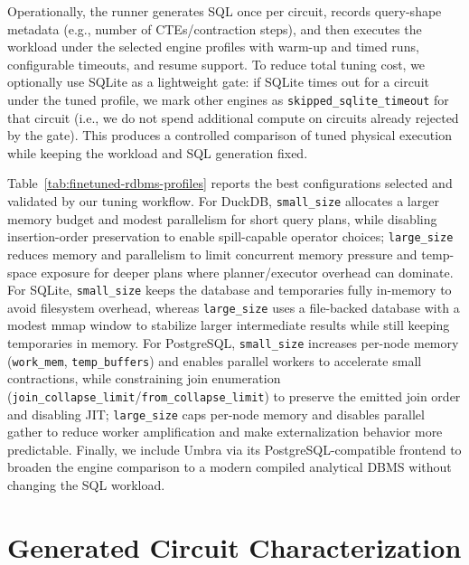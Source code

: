 Operationally, the runner generates SQL once per circuit, records query-shape metadata
(e.g., number of CTEs/contraction steps), and then executes the workload under the
selected engine profiles with warm-up and timed runs, configurable timeouts, and resume
support. To reduce total tuning cost, we optionally use SQLite as a lightweight gate:
if SQLite times out for a circuit under the tuned profile, we mark other engines as
\texttt{skipped\_sqlite\_timeout} for that circuit (i.e., we do not spend additional
compute on circuits already rejected by the gate). This produces a controlled comparison
of tuned physical execution while keeping the workload and SQL generation fixed.

Table~\ref{tab:finetuned-rdbms-profiles} reports the best configurations selected and validated by our tuning workflow. For DuckDB, \texttt{small\_size} allocates a larger memory budget and modest parallelism for short query plans, while disabling insertion-order preservation to enable spill-capable operator choices; \texttt{large\_size} reduces memory and parallelism to limit concurrent memory pressure and temp-space exposure for deeper plans where planner/executor overhead can dominate. For SQLite, \texttt{small\_size} keeps the database and temporaries fully in-memory to avoid filesystem overhead, whereas \texttt{large\_size} uses a file-backed database with a modest mmap window to stabilize larger intermediate results while still keeping temporaries in memory. For PostgreSQL, \texttt{small\_size} increases per-node memory (\texttt{work\_mem}, \texttt{temp\_buffers}) and enables parallel workers to accelerate small contractions, while constraining join enumeration (\texttt{join\_collapse\_limit}/\texttt{from\_collapse\_limit}) to preserve the emitted join order and disabling JIT; \texttt{large\_size} caps per-node memory and disables parallel gather to reduce worker amplification and make externalization behavior more predictable. Finally, we include Umbra via its PostgreSQL-compatible frontend to broaden the engine comparison to a modern compiled analytical DBMS without changing the SQL workload.

\section{Generated Circuit Characterization}
\label{app:circuit-characterization}

